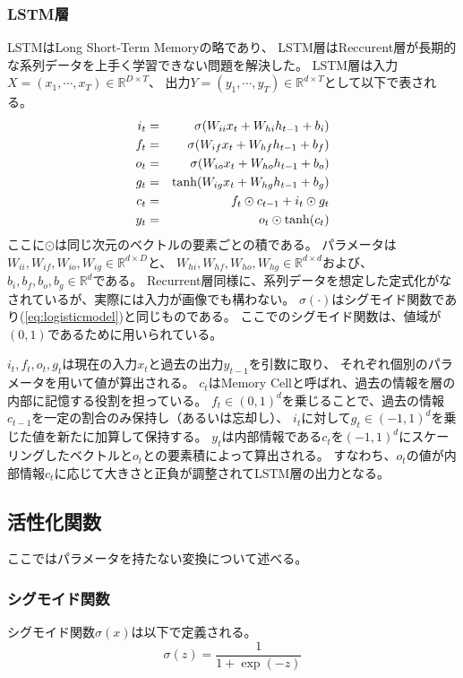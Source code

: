 \subsubsection{\rm LSTM\mc 層}
LSTMはLong Short-Term Memoryの略であり、
LSTM層はReccurent層が長期的な系列データを上手く学習できない問題を解決した。
LSTM層は入力\(X = (x_1,\cdots,x_T)\in \mathbb R^{D \times T}\)、
出力\(Y = (y_1,\cdots,y_T)\in \mathbb R^{d \times T}\)として以下で表される。
\begin{eqnarray}
    i_t &=& \sigma(W_{ii}x_t + W_{hi} h_{t-1} + b_i) \\
    f_t &=& \sigma(W_{if}x_t + W_{hf} h_{t-1} + b_f) \\
    o_t &=& \sigma(W_{io}x_t + W_{ho} h_{t-1} + b_o) \\
    g_t &=& {\rm tanh}(W_{ig}x_t + W_{hg} h_{t-1} + b_g) \\
    c_t &=& f_t \odot c_{t-1} + i_t \odot g_t \\
    y_t &=& o_t \odot {\rm tanh}(c_t)
    \label{eq:LSTM}
\end{eqnarray}
ここに\(\odot\)は同じ次元のベクトルの要素ごとの積である。
パラメータは\(W_{ii},W_{if},W_{io},W_{ig} \in \mathbb R^{d\times D}\)と、
\(W_{hi},W_{hf},W_{ho},W_{hg} \in \mathbb R^{d\times d}\)および、
\(b_{i},b_{f},b_{o},b_{g} \in \mathbb R^d\)である。
Recurrent層同様に、系列データを想定した定式化がなされているが、実際には入力が画像でも構わない。
\(\sigma(\cdot)\)はシグモイド関数であり(\ref{eq:logisticmodel})と同じものである。
ここでのシグモイド関数は、値域が\((0,1)\)であるために用いられている。

\(i_t,f_t,o_t,g_t\)は現在の入力\(x_t\)と過去の出力\(y_{t-1}\)を引数に取り、
それぞれ個別のパラメータを用いて値が算出される。
\(c_t\)はMemory Cellと呼ばれ、過去の情報を層の内部に記憶する役割を担っている。
\(f_t \in (0,1)^d \)を乗じることで、過去の情報\(c_{t-1}\)を一定の割合のみ保持し（あるいは忘却し）、
\(i_t\)に対して\(g_t \in (-1,1)^d\)を乗じた値を新たに加算して保持する。
\(y_t\)は内部情報である\(c_t\)を\((-1,1)^d\)にスケーリングしたベクトルと\(o_t\)との要素積によって算出される。
すなわち、\(o_t\)の値が内部情報\(c_t\)に応じて大きさと正負が調整されてLSTM層の出力となる。

\subsection{\mc 活性化関数}
ここではパラメータを持たない変換について述べる。
\subsubsection{\mc シグモイド関数}
シグモイド関数\(\sigma(x)\)は以下で定義される。
\begin{equation}
    \sigma(z) = \frac{1}{1+\exp(-z)}
\end{equation}

